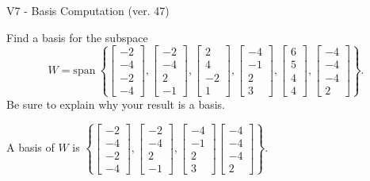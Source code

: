 \begin{exercise}
  \begin{exerciseTitle}V7 - Basis Computation (ver. 47)\end{exerciseTitle}
  \begin{exerciseStatement}
    Find a basis for the subspace 
\[W=\mathrm{span}\ \left\{\left[\begin{array}{r}
-2 \\
-4 \\
-2 \\
-4
\end{array}\right] , \left[\begin{array}{r}
-2 \\
-4 \\
2 \\
-1
\end{array}\right] , \left[\begin{array}{r}
2 \\
4 \\
-2 \\
1
\end{array}\right] , \left[\begin{array}{r}
-4 \\
-1 \\
2 \\
3
\end{array}\right] , \left[\begin{array}{r}
6 \\
5 \\
4 \\
4
\end{array}\right] , \left[\begin{array}{r}
-4 \\
-4 \\
-4 \\
2
\end{array}\right]\right\}.\]
 Be sure to explain why your result is a basis.


  \end{exerciseStatement}
  \begin{exerciseAnswer}
   A basis of \(W\) is  \(\left\{\left[\begin{array}{r}
-2 \\
-4 \\
-2 \\
-4
\end{array}\right] , \left[\begin{array}{r}
-2 \\
-4 \\
2 \\
-1
\end{array}\right] , \left[\begin{array}{r}
-4 \\
-1 \\
2 \\
3
\end{array}\right] \left[\begin{array}{r}
-4 \\
-4 \\
-4 \\
2
\end{array}\right]\right\}\).
  


  \end{exerciseAnswer}
\end{exercise}